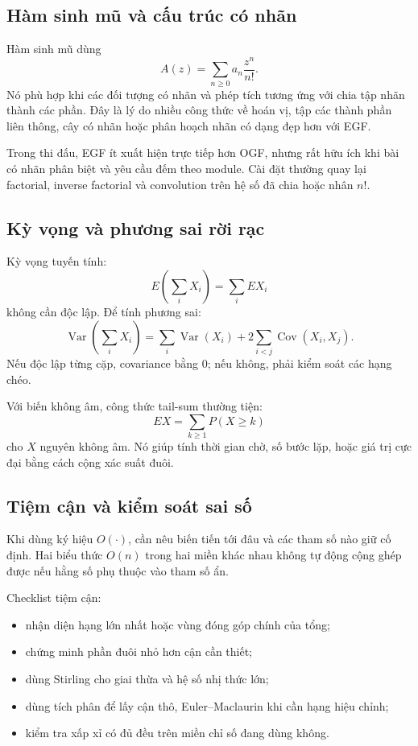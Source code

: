 \documentclass[11pt]{article}
\begin{document}
\subsection{Hàm sinh mũ và cấu trúc có nhãn}

Hàm sinh mũ dùng
\[
  A(z)=\sum_{n\ge0} a_n\frac{z^n}{n!}.
\]
Nó phù hợp khi các đối tượng có nhãn và phép tích tương ứng với chia tập nhãn
thành các phần. Đây là lý do nhiều công thức về hoán vị, tập các thành phần
liên thông, cây có nhãn hoặc phân hoạch nhãn có dạng đẹp hơn với EGF.

Trong thi đấu, EGF ít xuất hiện trực tiếp hơn OGF, nhưng rất hữu ích khi bài có
nhãn phân biệt và yêu cầu đếm theo module. Cài đặt thường quay lại factorial,
inverse factorial và convolution trên hệ số đã chia hoặc nhân \(n!\).

\subsection{Kỳ vọng và phương sai rời rạc}

Kỳ vọng tuyến tính:
\[
  E\left(\sum_i X_i\right)=\sum_i E X_i
\]
không cần độc lập. Để tính phương sai:
\[
  \operatorname{Var}\left(\sum_i X_i\right)
  =\sum_i\operatorname{Var}(X_i)+2\sum_{i<j}\operatorname{Cov}(X_i,X_j).
\]
Nếu độc lập từng cặp, covariance bằng 0; nếu không, phải kiểm soát các hạng
chéo.

Với biến không âm, công thức tail-sum thường tiện:
\[
  E X=\sum_{k\ge1} P(X\ge k)
\]
cho \(X\) nguyên không âm. Nó giúp tính thời gian chờ, số bước lặp, hoặc giá
trị cực đại bằng cách cộng xác suất đuôi.

\subsection{Tiệm cận và kiểm soát sai số}

Khi dùng ký hiệu \(O(\cdot)\), cần nêu biến tiến tới đâu và các tham số nào giữ
cố định. Hai biểu thức \(O(n)\) trong hai miền khác nhau không tự động cộng
ghép được nếu hằng số phụ thuộc vào tham số ẩn.

Checklist tiệm cận:
\begin{itemize}
  \item nhận diện hạng lớn nhất hoặc vùng đóng góp chính của tổng;
  \item chứng minh phần đuôi nhỏ hơn cận cần thiết;
  \item dùng Stirling cho giai thừa và hệ số nhị thức lớn;
  \item dùng tích phân để lấy cận thô, Euler--Maclaurin khi cần hạng hiệu chỉnh;
  \item kiểm tra xấp xỉ có đủ đều trên miền chỉ số đang dùng không.
\end{itemize}
\end{document}
